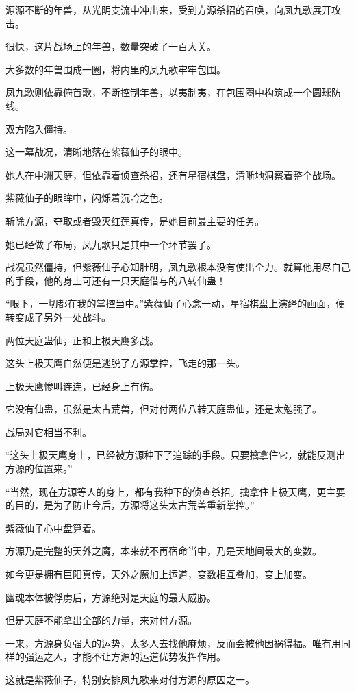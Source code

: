 \begin{this_body}
源源不断的年兽，从光阴支流中冲出来，受到方源杀招的召唤，向凤九歌展开攻击。

很快，这片战场上的年兽，数量突破了一百大关。

大多数的年兽围成一圈，将内里的凤九歌牢牢包围。

凤九歌则依靠俯首歌，不断控制年兽，以夷制夷，在包围圈中构筑成一个圆球防线。

双方陷入僵持。

这一幕战况，清晰地落在紫薇仙子的眼中。

她人在中洲天庭，但依靠着侦查杀招，还有星宿棋盘，清晰地洞察着整个战场。

紫薇仙子的眼眸中，闪烁着沉吟之色。

斩除方源，夺取或者毁灭红莲真传，是她目前最主要的任务。

她已经做了布局，凤九歌只是其中一个环节罢了。

战况虽然僵持，但紫薇仙子心知肚明，凤九歌根本没有使出全力。就算他用尽自己的手段，他的身上可还有一只天庭借与的八转仙蛊！

“眼下，一切都在我的掌控当中。”紫薇仙子心念一动，星宿棋盘上演绎的画面，便转变成了另外一处战斗。

两位天庭蛊仙，正和上极天鹰多战。

这头上极天鹰自然便是逃脱了方源掌控，飞走的那一头。

上极天鹰惨叫连连，已经身上有伤。

它没有仙蛊，虽然是太古荒兽，但对付两位八转天庭蛊仙，还是太勉强了。

战局对它相当不利。

“这头上极天鹰身上，已经被方源种下了追踪的手段。只要擒拿住它，就能反测出方源的位置来。”

“当然，现在方源等人的身上，都有我种下的侦查杀招。擒拿住上极天鹰，更主要的目的，是为了防止今后，方源将这头太古荒兽重新掌控。”

紫薇仙子心中盘算着。

方源乃是完整的天外之魔，本来就不再宿命当中，乃是天地间最大的变数。

如今更是拥有巨阳真传，天外之魔加上运道，变数相互叠加，变上加变。

幽魂本体被俘虏后，方源绝对是天庭的最大威胁。

但是天庭不能拿出全部的力量，来对付方源。

一来，方源身负强大的运势，太多人去找他麻烦，反而会被他因祸得福。唯有用同样的强运之人，才能不让方源的运道优势发挥作用。

这就是紫薇仙子，特别安排凤九歌来对付方源的原因之一。


\end{this_body}
